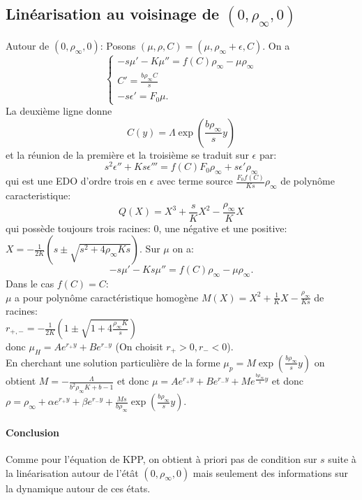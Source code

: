 \documentclass[11pt]{article}
\begin{document}
\subsection{Linéarisation au voisinage de $(0,\rho_\infty,0)$} 
Autour de $(0,\rho_\infty,0)$:
Posons $(\mu,\rho,C)=(\mu, \rho_\infty + \epsilon, C)$. On a \\
\begin{equation} \left\{ \begin{array}{ll} -s \mu'-K\mu''=f(C)\rho_\infty-\mu\rho_\infty\\C'=\frac{b\rho_\infty C}{s} \\
-s\epsilon'= F_0\mu. \end{array}\right.
\end{equation}
La deuxième ligne donne \begin{equation}
C(y) = \Lambda\exp(\frac{b\rho_\infty}{s}y )
\end{equation}
et la réunion de la première et la troisième se traduit sur $\epsilon$ par:
\begin{equation}
	s^2 \epsilon''+Ks\epsilon'''=f(C)F_0\rho_\infty+s\epsilon'\rho_\infty
\end{equation} qui est une EDO d'ordre trois en $\epsilon$ avec terme source $\frac{F_0f(C)}{Ks} \rho_\infty$ de polynôme caracteristique: \begin{equation}
	Q(X)=X^3+\frac{s}{K}X^2-\frac{\rho_\infty}{K}X
\end{equation}
qui possède toujours trois racines:  $0$, une négative et une positive: $X= - \frac{1}{2K}(s \pm \sqrt{s^2+4\rho_\infty Ks}).$
Sur $\mu$ on a: \begin{equation}
	-s \mu'-Ks\mu''=f(C)\rho_\infty-\mu\rho_\infty.
\end{equation}
Dans le cas $f(C)=C$:\\
$\mu$ a pour polynôme caractéristique homogène $M(X)=X^2 +\frac{1}{K}X - \frac{\rho_\infty}{Ks}$ de racines:\\$r_{+,-}= - \frac{1}{2K}(1 \pm \sqrt{1+4 \frac{\rho_\infty K}{s}})$ \\ donc $\mu_H = Ae^{r_+y}+ Be^{r_-y}$ (On choisit $r_+>0, r_-<0$).\\
En cherchant une solution particulière de la forme $\mu_p =M\exp(\frac{b\rho_\infty}{s}y )$ on obtient $M = - \frac{\Lambda}{b^2\rho_\infty K + b - 1}$ et donc $\mu=Ae^{r_+y}+ Be^{r_-y}+M e^{\frac{b\rho_\infty}{s}y }$
et donc $\rho = \rho_\infty + \alpha e^{r_+y} + \beta e^{r_-y} + \frac{Ms}{b\rho_\infty}\exp(\frac{b\rho_\infty}{s}y)$.
\paragraph{Conclusion}
Comme pour l'équation de KPP, on obtient à priori pas de condition sur $s$ suite à la linéarisation autour de l'étât $(0,\rho_\infty,0)$ mais seulement des informations sur la dynamique autour de ces états.
\ifdefined\COMPLETE
\else
\end{document}
